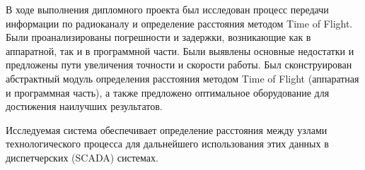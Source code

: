 В ходе выполнения дипломного проекта был исследован процесс передачи информации по радиоканалу и определение расстояния методом Time of Flight. Были проанализированы погрешности и задержки, возникающие как в аппаратной, так и в программной части. Были выявлены основные недостатки и предложены пути увеличения точности и скорости работы. Был сконструирован абстрактный модуль определения расстояния методом Time of Flight (аппаратная и программная часть), а также предложено оптимальное оборудование для достижения наилучших результатов.

Исследуемая система обеспечивает определение расстояния между узлами технологического процесса для дальнейшего использования этих данных в диспетчерских (SCADA) системах.
